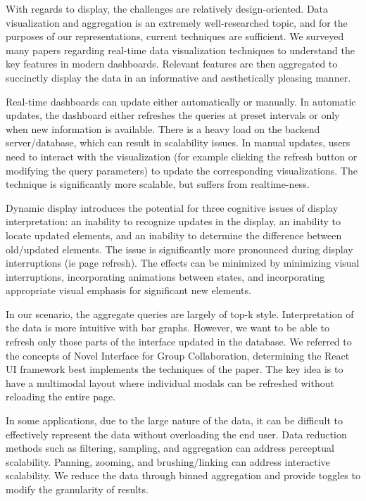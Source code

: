 With regards to display, the challenges are relatively design-oriented. Data visualization and aggregation is an extremely well-researched topic, and for the purposes of our representations, current techniques are sufficient. We surveyed many papers regarding real-time data visualization techniques\cite{HealthcareDashboard}\cite{CityDashboard} to understand the key features in modern dashboards. Relevant features are then aggregated to succinctly display the data in an informative and aesthetically pleasing manner.

Real-time dashboards can update either automatically or manually. In automatic updates, the dashboard either refreshes the queries at preset intervals or only when new information is available. There is a heavy load on the backend server/database, which can result in scalability issues. In manual updates, users need to interact with the visualization (for example clicking the refresh button or modifying the query parameters) to update the corresponding visualizations. The technique is significantly more scalable, but suffers from realtime-ness.\cite{CityDashboard}

Dynamic display introduces the potential for three cognitive issues of display interpretation: an inability to recognize updates in the display, an inability to locate updated elements, and an inability to determine the difference between old/updated elements. The issue is significantly more pronounced during display interruptions (ie page refresh). The effects can be minimized by minimizing visual interruptions, incorporating animations between states, and incorporating appropriate visual emphasis for significant new elements.\cite{AttentionAwareDashboards}

In our scenario, the aggregate queries are largely of top-k style. Interpretation of the data is more intuitive with bar graphs. However, we want to be able to refresh only those parts of the interface updated in the database. We referred to the concepts of Novel Interface for Group Collaboration\cite{GroupCollab}, determining the React UI framework best implements the techniques of the paper. The key idea is to have a multimodal layout\cite{MultimodalInterface} where individual modals can be refreshed without reloading the entire page.

In some applications, due to the large nature of the data, it can be difficult to effectively represent the data without overloading the end user. Data reduction methods such as filtering, sampling, and aggregation can address perceptual scalability. Panning, zooming, and brushing/linking can address interactive scalability. We reduce the data through binned aggregation and provide toggles to modify the granularity of results.\cite{InteractiveVisualization}

